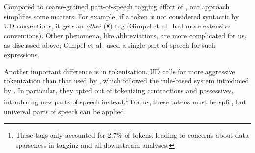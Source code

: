 \documentclass[11pt,a4paper]{article}
\begin{document}
Compared to coarse-grained part-of-speech tagging effort of
, our approach simplifies some
matters.  For example, if a token is not considered syntactic by UD
conventions, it gets an \emph{other} (\texttt{X}) tag (Gimpel et
al.~had more extensive conventions).  Other phenomena, like
abbreviations, are more complicated for us, as discussed above;
Gimpel et al.~used a single part of speech for such expressions.


Another important difference is in tokenization.  UD calls for more
aggressive tokenization than that used by
, which followed the rule-based
system  introduced by 
.  In particular, they opted out of tokenizing
contractions and possessives, introducing new parts of speech
instead.\footnote{These tags only accounted for 2.7\% of tokens,
  leading to concerns about data sparseness in tagging and all
  downstream analyses.}  For us, these tokens must be split, but
universal parts of speech can be applied.
\end{document}
